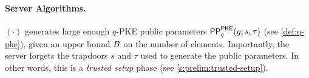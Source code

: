 \paragraph{Server Algorithms.}
{\setup}$(\cdot)$ generates large enough $q$-PKE public parameters $\mathsf{PP}^\mathsf{PKE}_q(g; s,\tau)$ (see \cref{def:q-pke}), given an upper bound $B$ on the number of elements.
Importantly, the server forgets the trapdoors $s$ and $\tau$ used to generate the public parameters.
In other words, this is a \emph{trusted setup} phase (see \cref{s:prelim:trusted-setup}).

%
%
%

